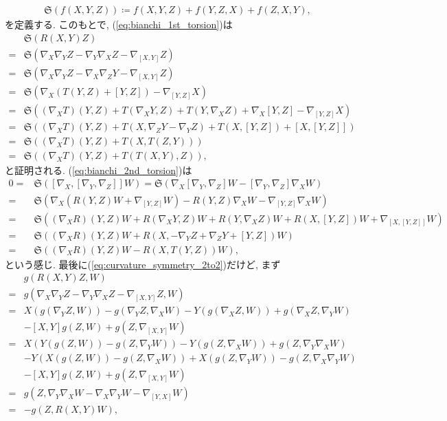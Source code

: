 \documentclass{ltjsarticle}
\theoremstyle{definition}
\begin{document}
\begin{gather}
\mathfrak S(f(X,Y,Z))\coloneqq f(X,Y,Z)+f(Y,Z,X)+f(Z,X,Y),
\end{gather}
を定義する. このもとで, (\ref{eq:bianchi_1st_torsion})は
\begin{align}
&\mathfrak S(R(X,Y)Z)\\
=&\mathfrak S(\nabla_X\nabla_YZ-\nabla_Y\nabla_XZ-\nabla_{[X,Y]}Z)\\
=&\mathfrak S(\nabla_X\nabla_YZ-\nabla_X\nabla_ZY-\nabla_{[X,Y]}Z)\\
=&\mathfrak S(\nabla_X(T(Y,Z)+[Y,Z])-\nabla_{[Y,Z]}X)\\
=&\mathfrak S((\nabla_XT)(Y,Z)+T(\nabla_XY,Z)+T(Y,\nabla_XZ)+\nabla_X[Y,Z]-\nabla_{[Y,Z]}X)\\
=&\mathfrak S((\nabla_XT)(Y,Z)+T(X,\nabla_ZY-\nabla_YZ)+T(X,[Y,Z])+[X,[Y,Z]])\\
=&\mathfrak S((\nabla_XT)(Y,Z)+T(X,T(Z,Y)))\\
=&\mathfrak S((\nabla_XT)(Y,Z)+T(T(X,Y),Z)),
\end{align}
と証明される. (\ref{eq:bianchi_2nd_torsion})は
\begin{align}
0=&\mathfrak S([\nabla_X,[\nabla_Y,\nabla_Z]]W)=\mathfrak S(\nabla_X[\nabla_Y,\nabla_Z]W-[\nabla_Y,\nabla_Z]\nabla_XW)\\
=&\mathfrak S(\nabla_X(R(Y,Z)W+\nabla_{[Y,Z]}W)-R(Y,Z)\nabla_XW-\nabla_{[Y,Z]}\nabla_XW)\\
=&\mathfrak S((\nabla_XR)(Y,Z)W+R(\nabla_XY,Z)W+R(Y,\nabla_XZ)W+R(X,[Y,Z])W+\nabla_{[X,[Y,Z]]}W)\\
=&\mathfrak S((\nabla_XR)(Y,Z)W+R(X,-\nabla_YZ+\nabla_ZY+[Y,Z])W)\\
=&\mathfrak S((\nabla_XR)(Y,Z)W-R(X,T(Y,Z))W),
\end{align}
という感じ. 最後に(\ref{eq:curvature_symmetry_2to2})だけど, まず
\begin{align}
&g(R(X,Y)Z,W)\\
=&g(\nabla_X\nabla_YZ-\nabla_Y\nabla_XZ-\nabla_{[X,Y]}Z,W)\\
=&X(g(\nabla_YZ,W))-g(\nabla_YZ,\nabla_XW)-Y(g(\nabla_XZ,W))+g(\nabla_XZ,\nabla_YW)\nonumber\\
&-[X,Y]g(Z,W)+g(Z,\nabla_{[X,Y]}W)\\
=&X(Y(g(Z,W))-g(Z,\nabla_YW))-Y(g(Z,\nabla_XW))+g(Z,\nabla_Y\nabla_XW)\nonumber\\
&-Y(X(g(Z,W))-g(Z,\nabla_XW))+X(g(Z,\nabla_YW))-g(Z,\nabla_X\nabla_YW)\nonumber\\
&-[X,Y]g(Z,W)+g(Z,\nabla_{[X,Y]}W)\\
=&g(Z,\nabla_Y\nabla_XW-\nabla_X\nabla_YW-\nabla_{[Y,X]}W)\\
=&-g(Z,R(X,Y)W),
\end{align}
\end{document}
